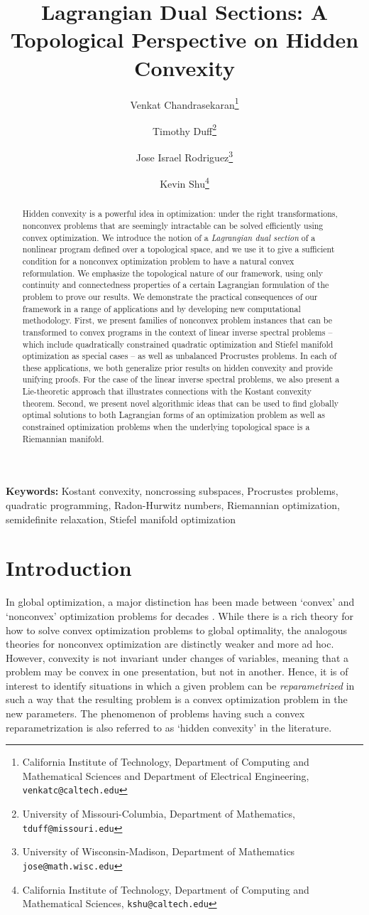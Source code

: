 \documentclass{article}
\title{Lagrangian Dual Sections: A Topological Perspective on Hidden Convexity}
\author{
    Venkat Chandrasekaran\footnote{California Institute of Technology, Department of Computing and Mathematical Sciences and Department of Electrical Engineering, \texttt{venkatc@caltech.edu}}
    \and
    Timothy Duff\footnote{University of Missouri-Columbia, Department of Mathematics, \texttt{tduff@missouri.edu}}
    \and
    Jose Israel Rodriguez\footnote{University of Wisconsin-Madison, Department of Mathematics \texttt{jose@math.wisc.edu}}
    \and
    Kevin Shu\footnote{California Institute of Technology, Department of Computing and Mathematical Sciences, \texttt{kshu@caltech.edu}}
}
\numberwithin{equation}{section}
\begin{document}
\maketitle
\begin{abstract}
    Hidden convexity is a powerful idea in optimization: under the right transformations, nonconvex problems that are seemingly intractable can be solved efficiently using convex optimization. 
    We introduce the notion of a \emph{Lagrangian dual section} of a nonlinear program defined over a topological space, and we use it to give a sufficient condition for a nonconvex optimization problem to have a natural convex reformulation.
    We emphasize the topological nature of our framework, using only continuity and connectedness properties of a certain Lagrangian formulation of the problem to prove our results.  We demonstrate the practical consequences of our framework in a range of applications and by developing new computational methodology.
    First, we present families of nonconvex problem instances that can be transformed to convex programs in the context of linear inverse spectral problems -- which include quadratically constrained quadratic optimization and Stiefel manifold optimization as special cases -- as well as unbalanced Procrustes problems.
    In each of these applications, we both generalize prior results on hidden convexity and provide unifying proofs.  For the case of the linear inverse spectral problems, %
    we also present a Lie-theoretic approach that illustrates connections with the Kostant convexity theorem.
    Second, we present novel algorithmic ideas that can be used to find globally optimal solutions to both Lagrangian forms of an optimization problem as well as constrained optimization problems when the underlying topological space is a Riemannian manifold.
\end{abstract}
\textbf{Keywords: }
    Kostant convexity, noncrossing subspaces, Procrustes problems, quadratic programming, Radon-Hurwitz numbers, Riemannian optimization, semidefinite relaxation, Stiefel manifold optimization

\section{Introduction}

In global optimization, a major distinction has been made between `convex' and `nonconvex' optimization problems for decades \cite{rockafellar1993lagrange}.
While there is a rich theory for how to solve convex optimization problems to global optimality, the analogous theories for nonconvex optimization are distinctly weaker and more ad hoc.
However, convexity is not invariant under changes of variables, meaning that a problem may be convex in one presentation, but not in another.
Hence, it is of interest to identify situations in which a given problem can be \emph{reparametrized} in such a way that the resulting problem is a convex optimization problem in the new parameters. The phenomenon of problems having such a convex reparametrization is also referred to as `hidden convexity' in the literature.
\end{document}
